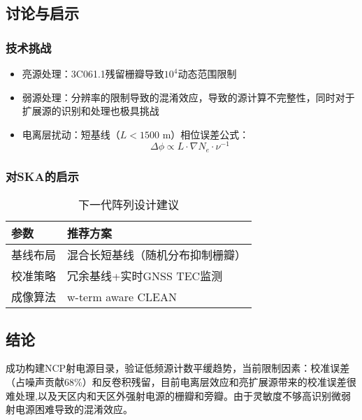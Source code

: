 \documentclass{article}
\begin{document}
\subsection{讨论与启示}
\subsubsection{技术挑战}
\begin{itemize}
\item 亮源处理：3C061.1残留栅瓣导致$10^4$动态范围限制
\item 弱源处理：分辨率的限制导致的混淆效应，导致的源计算不完整性，同时对于扩展源的识别和处理也极具挑战 
\item 电离层扰动：短基线（$L<1500$ m）相位误差公式：
  \begin{equation}
    \Delta\phi \propto L\cdot\nabla N_e\cdot\nu^{-1}
  \end{equation}
\end{itemize}

\subsubsection{对SKA的启示}
\begin{table}[ht]
\centering
\caption{下一代阵列设计建议}
\label{tab:skalow}
\begin{tabular}{@{}ll@{}}
\toprule
参数 & 推荐方案 \\
\midrule
基线布局 & 混合长短基线（随机分布抑制栅瓣） \\
校准策略 & 冗余基线+实时GNSS TEC监测 \\
成像算法 & w-term aware CLEAN \\
\bottomrule
\end{tabular}
\end{table}

\subsection{结论}
成功构建NCP射电源目录，验证低频源计数平缓趋势，当前限制因素：校准误差（占噪声贡献68\%）和反卷积残留，目前电离层效应和亮扩展源带来的校准误差很难处理,以及天区内和天区外强射电源的栅瓣和旁瓣。由于灵敏度不够高识别微弱射电源困难导致的混淆效应。
\end{document}
